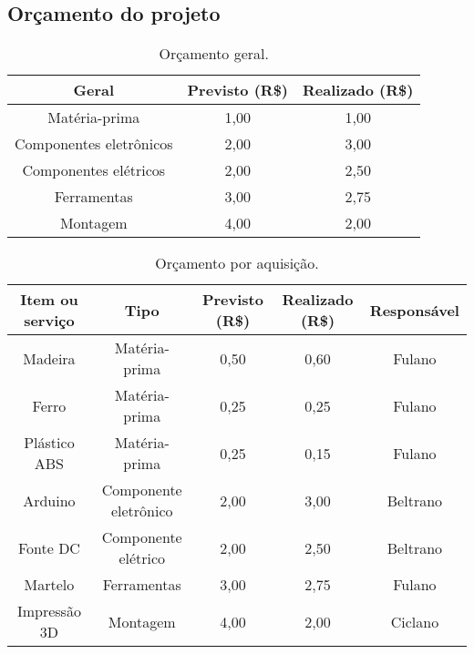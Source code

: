\begin{landscape}

\chapter{Orçamento do projeto}

\begin{table}[htpb]
\begin{center}
\caption{Orçamento geral.}
\begin{tabular}{|c|c|c|}
\hline
\textbf{Geral}          & \textbf{Previsto (R\$)} & \textbf{Realizado (R\$)} \\ \hline
Matéria-prima           & 1,00                    & 1,00                     \\ \hline
Componentes eletrônicos & 2,00                    & 3,00                     \\ \hline
Componentes elétricos   & 2,00                    & 2,50                     \\ \hline
Ferramentas             & 3,00                    & 2,75                     \\ \hline
Montagem                & 4,00                    & 2,00                     \\ \hline
\end{tabular}
\end{center}
\end{table}

\begin{table}[htpb]
\begin{center}
\caption{Orçamento por aquisição.}
\begin{tabular}{|c|c|c|c|c|}
\hline
\textbf{Item ou serviço} & \textbf{Tipo} & \textbf{Previsto (R\$)} & \textbf{Realizado (R\$)} & \textbf{Responsável} \\ \hline
Madeira      & Matéria-prima & 0,50   & 0,60 & Fulano                    \\ \hline
Ferro        & Matéria-prima & 0,25   & 0,25 & Fulano                    \\ \hline
Plástico ABS & Matéria-prima & 0,25   & 0,15 & Fulano                    \\ \hline
Arduino      & Componente eletrônico & 2,00  & 3,00 & Beltrano                     \\ \hline
Fonte DC     & Componente elétrico & 2,00   & 2,50 & Beltrano                     \\ \hline
Martelo & Ferramentas & 3,00   & 2,75 & Fulano                     \\ \hline
Impressão 3D & Montagem & 4,00   & 2,00 & Ciclano                   \\ \hline
\end{tabular}
\end{center}
\end{table}


\end{landscape}
